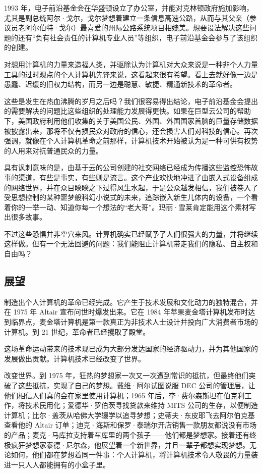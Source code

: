 \documentclass[12pt,UTF8]{ctexbook}
\begin{document}
1993 年，电子前沿基金会在华盛顿设立了办公室，并能对克林顿政府施加影响，尤其是副总统阿尔·戈尔，戈尔梦想着建立一条信息高速公路，从而与其父亲（参议员老阿尔伯特·戈尔）最喜爱的州际公路系统项目相媲美。想要设法解决这些问题的还有“负有社会责任的计算机专业人员”等组织，电子前沿基金会参与了该组织的创建。

对想用计算机的力量来造福人类，并驱除认为计算机对大众来说是一种非个人力量工具的过时观点的个人计算机先锋来说，这看起来很有希望。看上去就好像一边是愚蠢、迟缓的旧权力结构，而另一边是聪慧、敏捷、精通新技术的革命者。

这些是发生在热血沸腾的岁月之后吗？我们很容易得出结论，电子前沿基金会提出的需要解决的问题比这些组织的处理能力发展得更快。如果在巨型云公司的帮助下，美国政府利用他们收集的关于美国公民、外国、外国国家首脑的巨量存储数据被披露出来，那将不仅有损民众对政府的信心，还会损害人们对科技的信心。再次强调，就像在个人计算机革命之前那样，计算机技术开始被认为是一种可供有权势的人用来对抗普通民众的力量。

具有讽刺意味的是，由基于云的公司创建的社交网络已经成为传播这些监控恐怖故事的渠道，有些是事实，有些则是流言。这个产业欢快地冲进了由嵌入式设备组成的网络世界，并在众目睽睽之下过得风生水起，于是公众越发相信，我们被卷入了受思想控制的某种噩梦般科幻小说式的未来，追踪嵌入新生儿体内的设备，一个看着你的一举一动、知道你每一个想法的“老大哥”。玛丽·雪莱肯定能用这个素材写出很多故事。

不过这些恐惧并非空穴来风。计算机确实已经赋予了人们很强大的力量，并将继续这样做。但有一个无法回避的问题：我们能阻止计算机带走我们的隐私、自主权和自由吗？





\subsection{展望}


制造出个人计算机的革命已经完成。它产生于技术发展和文化动力的独特混合，并在 1975 年 Altair 宣布问世时爆发出来。它在 1984 年苹果麦金塔计算机发布时达到临界点，麦金塔计算机是第一款真正为非技术人士设计并投向广大消费者市场的计算机。到 21 世纪，革命者已经攫取了殿堂。

这场革命运动带来的技术现已成为大部分发达国家的经济驱动力，并为其他国家的发展做出贡献。计算机技术已经改变了世界。

改变世界。到 1975 年，狂热的梦想家一次又一次遭到常识的抵抗，但最终他们突破了这些抵抗，实现了自己的梦想。戴维·阿尔试图说服 DEC 公司的管理层，让他们相信人们真的会在家里使用计算机；1965 年后，李·费尔森斯坦在伯克利工作，将技术民用化；爱德华·罗伯茨寻找贷款来维持 MITS 公司的生存，以便制造计算机；比尔·盖茨从哈佛大学辍学以追寻梦想；史蒂夫·东皮耶飞去阿尔伯克基查看他的 Altair 订单；迪克·海斯和保罗·泰瑞尔开店销售一款朋友都说没有市场的产品；麦克·马库拉支持着车库里的两个孩子——他们都是梦想家。接着还有终极疯狂梦想家泰德·尼尔森，他展望着一个新世界，并且一辈子都想实现梦想。无论如何，他们都在梦想着同一件事：个人计算机，将计算机技术令人敬畏的力量装进一只人人都能拥有的小盒子里。
\end{document}
